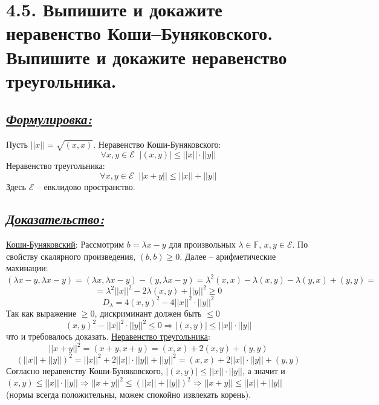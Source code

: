 \documentclass{article}
\begin{document}
\section*{\LARGE 4.5. Выпишите и докажите неравенство Коши–Буняковского. Выпишите и докажите неравенство треугольника.  }
\subsection*{\Large \underline{\textit{Формулировка: }}}
Пусть $||x|| = \sqrt{(x, x)}$.
\newline Неравенство Коши-Буняковского:
$$
\forall x, y \in \mathcal{E} \;\; |(x, y)| \le ||x||\cdot ||y||
$$
Неравенство треугольника:
$$
\forall x,y \in \mathcal{E} \;\; ||x + y|| \le ||x|| + ||y||
$$
Здесь $\mathcal{E}$ -- евклидово пространство.

\subsection*{\Large \underline{\textit{Доказательство: }}}
\underline{Коши-Буняковский}:
\newline Рассмотрим $b = \lambda x - y$ для произвольных $\lambda \in \mathbb{F},\, x,y \in \mathcal{E}$. По свойству скалярного произведения, $(b, b) \ge 0$. Далее -- арифметические махинации:
$$(\lambda x - y, \lambda x - y) = (\lambda x, \lambda x - y) - (y, \lambda x - y) = \lambda^2(x, x) - \lambda(x, y) - \lambda(y, x) + (y, y) = $$ 
$$ = \lambda^2||x||^2 - 2\lambda(x, y) + ||y||^2 \ge 0 $$
$$ D_\lambda = 4(x, y)^2 - 4||x||^2\cdot||y||^2 $$
Так как выражение $\ge 0$, дискриминант должен быть $ \le 0$
$$
(x, y)^2 - ||x||^2\cdot||y||^2 \le 0 \Rightarrow |(x, y)| \le ||x||\cdot||y||
$$
что и требовалось доказать.
\newline \underline{Неравенство треугольника}:
$$||x + y||^2 = (x + y, x + y) = (x, x) + \boxed{2(x, y)} + (y, y)$$
$$(||x|| + ||y||)^2 = ||x||^2 + 2||x||\cdot||y|| + ||y||^2 = (x, x) + \boxed{2||x||\cdot||y||} + (y, y)$$
Согласно неравенству Коши-Буняковского, $|(x, y)| \le ||x||\cdot||y||$, а значит и $(x, y) \le ||x||\cdot||y|| \Rightarrow ||x + y||^2 \le (||x|| + ||y||)^2 \Rightarrow ||x + y|| \le ||x|| + ||y||$ (нормы всегда положительны, можем спокойно извлекать корень).

\end{document}
